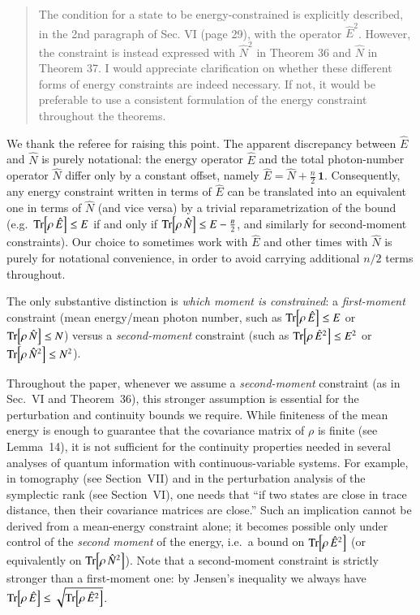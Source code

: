 \documentclass[a4paper,12pt]{article}
\newenvironment{Referee}[1]
{\noindent {\bf Comment #1:} \begin{quote} }
{\end{quote}\vspace{0 cm}}
\newenvironment{Response}
{\noindent \color{RawSienna}{\bf Response:} }
{\vspace{0.4 cm}}
\begin{document}
\begin{Referee}{4}
The condition for a state to be energy-constrained is explicitly described, in the 2nd paragraph of Sec. VI (page 29), with the operator $\hat{E}^2$. However, the constraint is instead expressed with $\hat{N}^2$ in Theorem 36 and $\hat{N}$ in Theorem 37. I would appreciate clarification on whether these different forms of energy constraints are indeed necessary. If not, it would be preferable to use a consistent formulation of the energy constraint throughout the theorems.
\end{Referee}
\begin{Response}
We thank the referee for raising this point. The apparent discrepancy between $\hat E$ and $\hat N$ is purely notational: the energy operator $\hat E$ and the total photon-number operator $\hat N$ differ only by a constant offset, namely $\hat E=\hat N+\frac n2\,\mathbf{1}$. Consequently, any energy constraint written in terms of $\hat E$ can be translated into an equivalent one in terms of $\hat N$ (and vice versa) by a trivial reparametrization of the bound (e.g.\ $\Tr[\rho\,\hat E]\le E$ if and only if $\Tr[\rho\,\hat N]\le E-\frac n2$, and similarly for second-moment constraints). Our choice to sometimes work with $\hat E$ and other times with $\hat N$ is purely for notational convenience, in order to avoid carrying additional $n/2$ terms throughout.



The only substantive distinction is \emph{which moment is constrained}: a \emph{first-moment} constraint (mean energy/mean photon number, such as $\Tr[\rho\,\hat E]\le E$ or $\Tr[\rho\,\hat N]\le N$) versus a \emph{second-moment} constraint (such as $\Tr[\rho\,\hat E^2]\le E^2$ or $\Tr[\rho\,\hat N^2]\le N^2$).


Throughout the paper, whenever we assume a \emph{second-moment} constraint (as in Sec.~VI and Theorem~36), this stronger assumption is essential for the perturbation and continuity bounds we require. While finiteness of the mean energy is enough to guarantee that the covariance matrix of $\rho$ is finite (see Lemma~14), it is not sufficient for the continuity properties needed in several analyses of quantum information with continuous-variable systems. For example, in tomography (see Section~VII) and in the perturbation analysis of the symplectic rank (see Section~VI), one needs that ``if two states are close in trace distance, then their covariance matrices are close.'' Such an implication cannot be derived from a mean-energy constraint alone; it becomes possible only under control of the \emph{second moment} of the energy, i.e.\ a bound on $\Tr[\rho\,\hat E^2]$ (or equivalently on $\Tr[\rho\,\hat N^2]$). Note that a second-moment constraint is strictly stronger than a first-moment one: by Jensen's inequality we always have $\Tr[\rho\,\hat E]\le \sqrt{\Tr[\rho\,\hat E^2]}$.



\end{Response}
\end{document}
